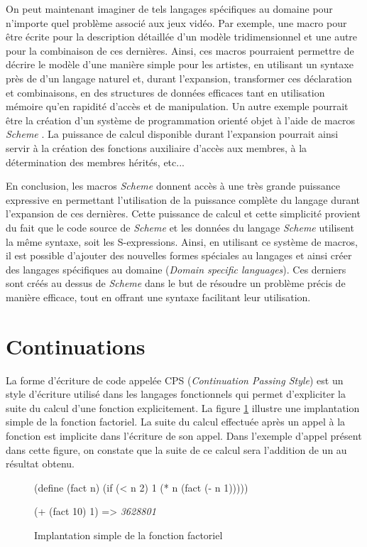 \documentclass[12pt,twoside,letterpaper,francais]{book}
\newcommand{\Schemelang}{{\textit{Scheme }}}
\newcommand{\scheme}[1]{\selectlanguage{english}{\tt #1}\selectlanguage{french}}
\newcommand{\schemeresult}[1]{{\it #1}}
\begin{document}
On peut maintenant imaginer de tels langages spécifiques au domaine
pour n'importe quel problème associé aux jeux vidéo. Par exemple, une
macro pour être écrite pour la description détaillée d'un modèle
tridimensionnel et une autre pour la combinaison de ces
dernières. Ainsi, ces macros pourraient permettre de décrire le modèle
d'une manière simple pour les artistes, en utilisant un syntaxe près
de d'un langage naturel et, durant l'expansion, transformer ces
déclaration et combinaisons, en des structures de données efficaces
tant en utilisation mémoire qu'en rapidité d'accès et de
manipulation. Un autre exemple pourrait être la création d'un système
de programmation orienté objet à l'aide de macros \Schemelang. La puissance
de calcul disponible durant l'expansion pourrait ainsi servir à la
création des fonctions auxiliaire d'accès aux membres, à la
détermination des membres hérités, etc...

En conclusion, les macros \Schemelang donnent accès à une très grande
puissance expressive en permettant l'utilisation de la puissance
complète du langage durant l'expansion de ces dernières. Cette
puissance de calcul et cette simplicité provient du fait que le code
source de \Schemelang et les données du langage \Schemelang utilisent la même
syntaxe, soit les S-expressions. Ainsi, en utilisant ce système de
macros, il est possible d'ajouter des nouvelles formes spéciales au
langages et ainsi créer des langages spécifiques au domaine
(\textit{Domain specific languages}). Ces derniers sont créés au
dessus de \Schemelang dans le but de résoudre un problème précis de manière
efficace, tout en offrant une syntaxe facilitant leur utilisation.


\FloatBarrier
\section{Continuations}
La forme d'écriture de code appelée CPS (\textit{Continuation Passing
  Style}) est un style d'écriture utilisé dans les langages
fonctionnels qui permet d'expliciter la suite du calcul d'une fonction
explicitement. La figure \ref{Scheme:fact} illustre une implantation
simple de la fonction factoriel. La suite du calcul effectuée après un
appel à la fonction \scheme{fact} est implicite dans l'écriture de son
appel. Dans l'exemple d'appel présent dans cette figure, on constate
que la suite de ce calcul sera l'addition de un au résultat obtenu.

\begin{figure}[htb!]
  \begin{schemecode}
(define (fact n)
  (if (< n 2)
      1
      (* n (fact (- n 1)))))

(+ (fact 10) 1) => \schemeresult{3628801}
  \end{schemecode}
  \caption{Implantation simple de la fonction factoriel}
  \label{Scheme:fact}
\end{figure}
\end{document}
